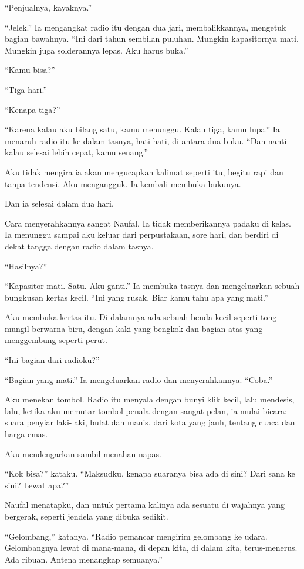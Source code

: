 \documentclass[11pt,twoside,openany]{book}
\makeatletter
\newcommand{\scenebreak}{\par\vspace{0.9em}{\centering\textsc{*\hspace{0.7em}*\hspace{0.7em}*}\par}\vspace{0.9em}\@afterindentfalse\@afterheading}
\makeatother
\begin{document}
``Penjualnya, kayaknya.''

``Jelek.'' Ia mengangkat radio itu dengan dua jari, membalikkannya, mengetuk bagian bawahnya. ``Ini dari tahun sembilan puluhan. Mungkin kapasitornya mati. Mungkin juga solderannya lepas. Aku harus buka.''

``Kamu bisa?''

``Tiga hari.''

``Kenapa tiga?''

``Karena kalau aku bilang satu, kamu menunggu. Kalau tiga, kamu lupa.'' Ia menaruh radio itu ke dalam tasnya, hati-hati, di antara dua buku. ``Dan nanti kalau selesai lebih cepat, kamu senang.''

Aku tidak mengira ia akan mengucapkan kalimat seperti itu, begitu rapi dan tanpa tendensi. Aku mengangguk. Ia kembali membuka bukunya.

Dan ia selesai dalam dua hari.

\scenebreak
Cara menyerahkannya sangat Naufal. Ia tidak memberikannya padaku di kelas. Ia menunggu sampai aku keluar dari perpustakaan, sore hari, dan berdiri di dekat tangga dengan radio dalam tasnya.

``Hasilnya?''

``Kapasitor mati. Satu. Aku ganti.'' Ia membuka tasnya dan mengeluarkan sebuah bungkusan kertas kecil. ``Ini yang rusak. Biar kamu tahu apa yang mati.''

Aku membuka kertas itu. Di dalamnya ada sebuah benda kecil seperti tong mungil berwarna biru, dengan kaki yang bengkok dan bagian atas yang menggembung seperti perut.

``Ini bagian dari radioku?''

``Bagian yang mati.'' Ia mengeluarkan radio dan menyerahkannya. ``Coba.''

Aku menekan tombol. Radio itu menyala dengan bunyi klik kecil, lalu mendesis, lalu, ketika aku memutar tombol penala dengan sangat pelan, ia mulai bicara: suara penyiar laki-laki, bulat dan manis, dari kota yang jauh, tentang cuaca dan harga emas.

Aku mendengarkan sambil menahan napas.

``Kok bisa?'' kataku. ``Maksudku, kenapa suaranya bisa ada di sini? Dari sana ke sini? Lewat apa?''

Naufal menatapku, dan untuk pertama kalinya ada sesuatu di wajahnya yang bergerak, seperti jendela yang dibuka sedikit.

``Gelombang,'' katanya. ``Radio pemancar mengirim gelombang ke udara. Gelombangnya lewat di mana-mana, di depan kita, di dalam kita, terus-menerus. Ada ribuan. Antena menangkap semuanya.''
\end{document}
